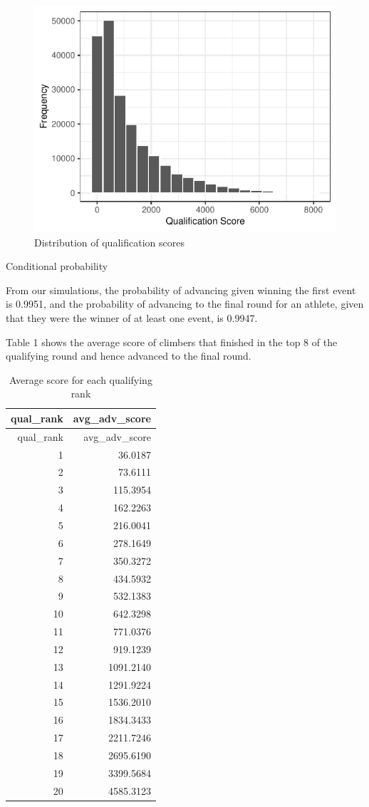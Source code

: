 \documentclass[
  11pt,
]{article}
\begin{document}
\begin{figure}
\centering
\includegraphics{draft_files/figure-latex/unnamed-chunk-3-1.pdf}
\caption{Distribution of qualification scores}
\end{figure}

Conditional probability

From our simulations, the probability of advancing given winning the
first event is 0.9951, and the probability of advancing to the final
round for an athlete, given that they were the winner of at least one
event, is 0.9947.

Table 1 shows the average score of climbers that finished in the top 8
of the qualifying round and hence advanced to the final round.

\begin{longtable}[]{@{}rr@{}}
\caption{Average score for each qualifying rank}\tabularnewline
\toprule
qual\_rank & avg\_adv\_score \\
\midrule
\endfirsthead
\toprule
qual\_rank & avg\_adv\_score \\
\midrule
\endhead
1 & 36.0187 \\
2 & 73.6111 \\
3 & 115.3954 \\
4 & 162.2263 \\
5 & 216.0041 \\
6 & 278.1649 \\
7 & 350.3272 \\
8 & 434.5932 \\
9 & 532.1383 \\
10 & 642.3298 \\
11 & 771.0376 \\
12 & 919.1239 \\
13 & 1091.2140 \\
14 & 1291.9224 \\
15 & 1536.2010 \\
16 & 1834.3433 \\
17 & 2211.7246 \\
18 & 2695.6190 \\
19 & 3399.5684 \\
20 & 4585.3123 \\
\bottomrule
\end{longtable}
\end{document}
